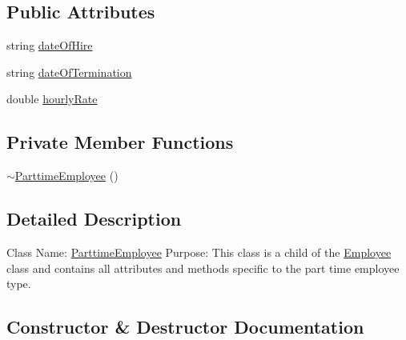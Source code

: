 \subsection*{Public Attributes}
\begin{DoxyCompactItemize}
\item 
string \hyperlink{class_all_employees_1_1_parttime_employee_ae9d23e6b09dc7c227d1b2bc3d7d0bfbb}{date\+Of\+Hire}
\item 
string \hyperlink{class_all_employees_1_1_parttime_employee_a7d8454cf20373d6ff757afb4d8502158}{date\+Of\+Termination}
\item 
double \hyperlink{class_all_employees_1_1_parttime_employee_a43bf804ba70f049a02ce73f2a65ff212}{hourly\+Rate}
\end{DoxyCompactItemize}
\subsection*{Private Member Functions}
\begin{DoxyCompactItemize}
\item 
\hyperlink{class_all_employees_1_1_parttime_employee_a5b2cdda19f28fdb256ea729818ec727b}{$\sim$\+Parttime\+Employee} ()
\end{DoxyCompactItemize}


\subsection{Detailed Description}
Class Name\+: \hyperlink{class_all_employees_1_1_parttime_employee}{Parttime\+Employee} Purpose\+: This class is a child of the \hyperlink{class_all_employees_1_1_employee}{Employee} class and contains all attributes and methods specific to the part time employee type. 

\subsection{Constructor \& Destructor Documentation}
\hypertarget{class_all_employees_1_1_parttime_employee_aefdb20ed1cc9fb007068380a97e3f51e}{}
